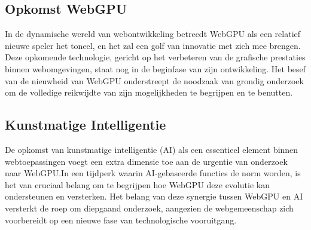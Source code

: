 





\subsection{Opkomst WebGPU}
In de dynamische wereld van webontwikkeling betreedt WebGPU als een relatief nieuwe speler het toneel, en het zal een golf van innovatie met zich mee brengen. Deze opkomende technologie, gericht op het verbeteren van de grafische prestaties binnen webomgevingen, staat nog in de beginfase van zijn ontwikkeling. Het besef van de nieuwheid van WebGPU onderstreept de noodzaak van grondig onderzoek om de volledige reikwijdte van zijn mogelijkheden te begrijpen en te benutten. 

\subsection{Kunstmatige Intelligentie}
De opkomst van kunstmatige intelligentie (AI) als een essentieel element binnen webtoepassingen voegt een extra dimensie toe aan de urgentie van onderzoek naar WebGPU.\@ In een tijdperk waarin AI-gebaseerde functies de norm worden, is het van cruciaal belang om te begrijpen hoe WebGPU deze evolutie kan ondersteunen en versterken. Het belang van deze synergie tussen WebGPU en AI versterkt de roep om diepgaand onderzoek, aangezien de webgemeenschap zich voorbereidt op een nieuwe fase van technologische vooruitgang.\autocite{Gu2023}


